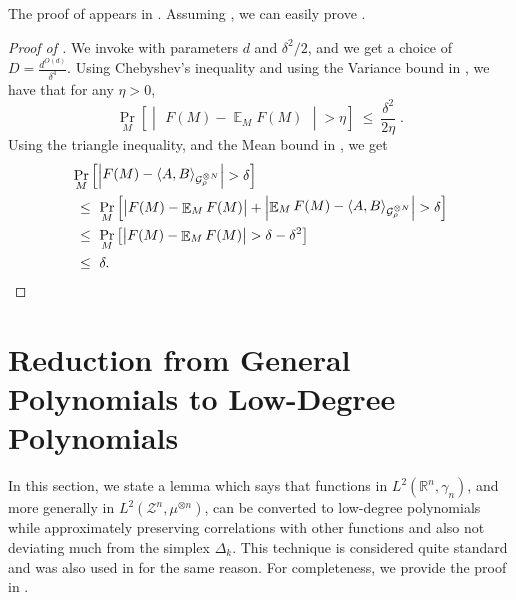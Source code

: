 \documentclass[11pt]{article}
\newcommand{\inparen}[1]{\left ( #1 \right )}
\newcommand{\insquare}[1]{\left [ #1 \right ]}
\newcommand{\inangle}[1]{\left \langle #1 \right \rangle}
\newcommand{\inabs}[1]{\begin{vmatrix} #1 \end{vmatrix}}
\DeclareMathOperator*{\Ex}{\mathbb{E}}
\DeclareMathOperator*{\Var}{\mathsf{Var}}
\newcommand{\bbR}{{\mathbb R}}
\newcommand{\calG}{\mathcal{G}}
\newcommand{\calZ}{\mathcal{Z}}
\begin{document}

\noindent The proof of  appears in . Assuming , we can easily prove .

\begin{proof}[Proof of ]
	We invoke  with parameters $d$ and $\delta^2/2$, and we get a choice of $D = \frac{d^{O(d)}}{\delta^4}$. Using Chebyshev's inequality and using the Variance bound in , we have that for any $\eta > 0$,
	\[ \Pr_M \insquare{\inabs{F(M) - \Ex_M F(M)} > \eta} ~\le~ \frac{\delta^2}{2\eta}\;.\]
	Using the triangle inequality, and the Mean bound in , we get
	\begin{align*}
		&\Pr_M \insquare{\inabs{F(M) - \inangle{A, B}_{\calG_{\rho}^{\otimes N}}} > \delta}\\
		& ~\le~ \Pr_M \insquare{\inabs{F(M) - \Ex_M F(M)} + \inabs{\Ex_M F(M) - \inangle{A, B}_{\calG_{\rho}^{\otimes N}}} > \delta}\\
		& ~\le~ \Pr_M \insquare{\inabs{F(M) - \Ex_M F(M)} > \delta - \delta^2}\\
		& ~\le~ \delta.\qedhere
	\end{align*}
\end{proof}


\section{Reduction from General Polynomials to Low-Degree Polynomials} \label{sec:smoothing}

In this section, we state a lemma which says that functions in $L^2(\bbR^n, \gamma_n)$, and more generally in $L^2(\calZ^n, \mu^{\otimes n})$, can be converted to low-degree polynomials while approximately preserving correlations with other functions and also not deviating much from the simplex $\Delta_k$. This technique is considered quite standard and was also used in \cite{GKS_NIS_decidable, DMN_NoiseStabilityComputable, DMN_NIS_decidable} for the same reason. For completeness, we provide the proof in .
\end{document}
